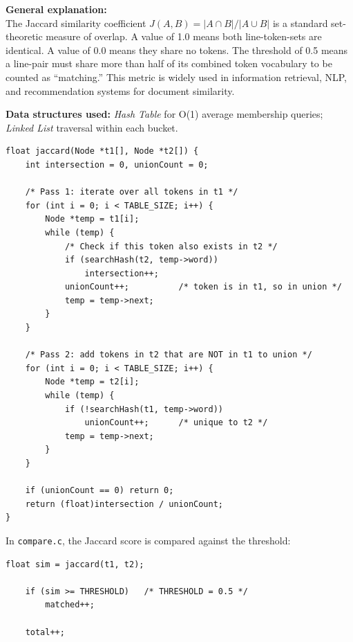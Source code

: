 \documentclass[12pt,a4paper]{article}
\begin{document}
\smallskip
\textbf{General explanation:}\\
The Jaccard similarity coefficient $J(A,B) = |A \cap B| / |A \cup B|$ is a standard set-theoretic measure of overlap. A value of 1.0 means both line-token-sets are identical. A value of 0.0 means they share no tokens. The threshold of 0.5 means a line-pair must share more than half of its combined token vocabulary to be counted as ``matching.'' This metric is widely used in information retrieval, NLP, and recommendation systems for document similarity.

\smallskip
\textbf{Data structures used:} \textit{Hash Table} for O(1) average membership queries; \textit{Linked List} traversal within each bucket.

\begin{lstlisting}[caption={\texttt{utils.c} -- \texttt{jaccard}: compute Jaccard similarity between two token sets}]
float jaccard(Node *t1[], Node *t2[]) {
    int intersection = 0, unionCount = 0;

    /* Pass 1: iterate over all tokens in t1 */
    for (int i = 0; i < TABLE_SIZE; i++) {
        Node *temp = t1[i];
        while (temp) {
            /* Check if this token also exists in t2 */
            if (searchHash(t2, temp->word))
                intersection++;
            unionCount++;          /* token is in t1, so in union */
            temp = temp->next;
        }
    }

    /* Pass 2: add tokens in t2 that are NOT in t1 to union */
    for (int i = 0; i < TABLE_SIZE; i++) {
        Node *temp = t2[i];
        while (temp) {
            if (!searchHash(t1, temp->word))
                unionCount++;      /* unique to t2 */
            temp = temp->next;
        }
    }

    if (unionCount == 0) return 0;
    return (float)intersection / unionCount;
}
\end{lstlisting}

In \texttt{compare.c}, the Jaccard score is compared against the threshold:

\begin{lstlisting}[caption={\texttt{compare.c} -- Applying threshold and accumulating match count}]
    float sim = jaccard(t1, t2);

    if (sim >= THRESHOLD)   /* THRESHOLD = 0.5 */
        matched++;

    total++;
\end{lstlisting}

\newpage
\end{document}
